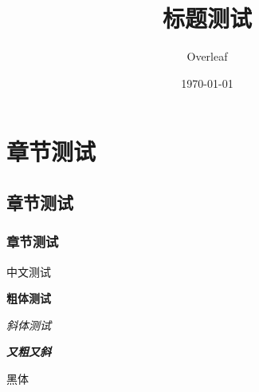 \documentclass{book}
\title{标题测试}
\author{Overleaf}
\date{\today}
\begin{document}
\maketitle
\section{章节测试}
\subsection{章节测试}
\subsubsection{章节测试}
中文测试

\textbf{粗体测试}

\textit{斜体测试}

\textit{\textbf{又粗又斜}}

\textsf{黑体}
\end{document}
